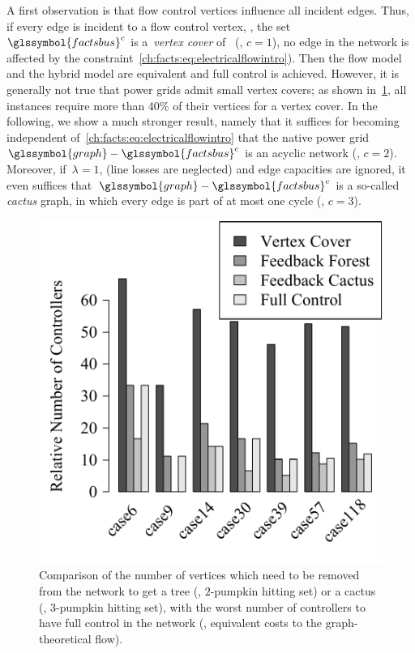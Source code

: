A first observation is that flow control vertices influence all incident edges.
Thus, if every edge is incident to a flow control vertex, \ie, the
set~$\glssymbol{factsbus}^c$ is a~\emph{vertex cover} of~ (\ie,
$c = 1$), no edge in the network is affected by the
constraint~\cref{ch:facts:eq:electricalflowintro}). Then the flow model and the
hybrid model are equivalent and full control is achieved. However, it is
generally not true that power grids admit small vertex covers; as shown
in~\cref{ch:facts:fig:barchart-cases-controller}, all instances require more
than 40\% of their vertices for a vertex cover. In the following, we show a much
stronger result, namely that it suffices for becoming independent
of~\cref{ch:facts:eq:electricalflowintro} that the native power
grid~$\glssymbol{graph}-{\glssymbol{factsbus}^c}$ is an acyclic network (\ie, $c
= 2$).  Moreover, if~$\lambda = 1$, (line losses are neglected) and edge
capacities are ignored, it even suffices
that~$\glssymbol{graph}-{\glssymbol{factsbus}^c}$ is a so-called \emph{cactus}
graph, in which every edge is part of at most one cycle (\ie, $c = 3$).
%
\begin{figure}[t!]
    \centering
    \includegraphics[width=\plotscaleOne\linewidth, trim = 0cm 0cm 0cm 0cm]{factsplacement/plots/plotBarchartCasesVsController.pdf}
    \caption[Comparison of the size of different~$c$-pumpkin hitting sets.]
    {Comparison of the number of vertices which need to be removed from
    the network to get a tree (\ie, $2$-pumpkin hitting set) or a cactus (\ie,
    $3$-pumpkin hitting set), with the worst number of controllers to have full
    control in the network (\ie, equivalent costs to the graph-theoretical
    flow).}
    \label{ch:facts:fig:barchart-cases-controller}
\end{figure}
